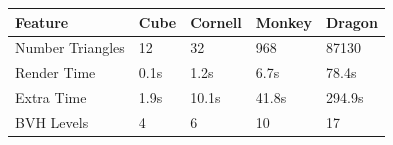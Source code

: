 \documentclass{article}
\begin{document}
    \vspace{5mm}
    
    \noindent\begin{tabular}{ |p{2.8cm}||p{1.6cm}|p{1.6cm}|p{1.6cm}|p{1.6cm}| }
      \hline
      \textbf{Feature} &\textbf{Cube} &\textbf{Cornell} &\textbf{Monkey} &\textbf{Dragon}\\
      \hline
      Number Triangles  &12     &32     &968    &87130\\
      Render Time       &0.1s   &1.2s   &6.7s   &78.4s\\
      Extra Time        &1.9s   &10.1s  &41.8s  &294.9s\\
      BVH Levels        &4      &6      &10     &17\\
      \hline
    \end{tabular}
\end{document}
